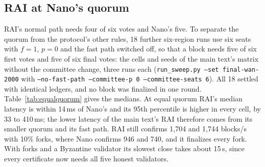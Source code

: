 \documentclass[conference]{IEEEtran}
\begin{document}
\subsection{RAI at Nano's quorum}
\label{app:equalquorum}
RAI's normal path needs four of six votes and Nano's five. To separate the quorum from the protocol's other rules, 18 further six-region runs use six seats with $f=1$, $p=0$ and the fast path switched off, so that a block needs five of six first votes and five of six final votes: the cells and seeds of the main text's matrix without the committee change, three runs each (\texttt{run\_sweep.py --set final-wan-2000} with \texttt{--no-fast-path --committee-p 0 --committee-seats 6}). All 18 settled with identical ledgers, and no block was finalized in one round. Table~\ref{tab:equalquorum} gives the medians. At equal quorum RAI's median latency is within 14\,ms of Nano's and its 95th percentile is higher in every cell, by 33 to 410\,ms; the lower latency of the main text's RAI therefore comes from its smaller quorum and its fast path. RAI still confirms 1{,}704 and 1{,}744 blocks/s with 10\% forks, where Nano confirms 946 and 740, and it finalizes every fork. With forks and a Byzantine validator its slowest close takes about 15\,s, since every certificate now needs all five honest validators.
\end{document}
